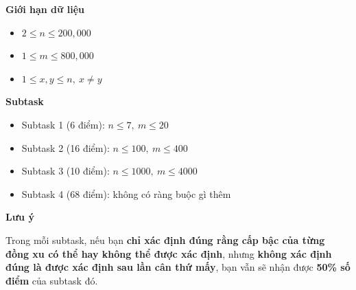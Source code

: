 \textbf{Giới hạn dữ liệu}

\begin{itemize}
\item $2 \le n \le 200{,}000$
\item $1 \le m \le 800{,}000$
\item $1 \le x, y \le n,\ x \ne y$
\end{itemize}

\textbf{Subtask}

\begin{itemize}
\item Subtask 1 (6 điểm): $n \le 7,\ m \le 20$
\item Subtask 2 (16 điểm): $n \le 100,\ m \le 400$
\item Subtask 3 (10 điểm): $n \le 1000,\ m \le 4000$
\item Subtask 4 (68 điểm): không có ràng buộc gì thêm
\end{itemize}

\textbf{Lưu ý}

Trong mỗi subtask, nếu bạn \textbf{chỉ xác định đúng rằng cấp bậc của từng đồng xu có thể hay không thể được xác định},  
nhưng \textbf{không xác định đúng là được xác định sau lần cân thứ mấy},  
bạn vẫn sẽ nhận được \textbf{50\% số điểm} của subtask đó.
